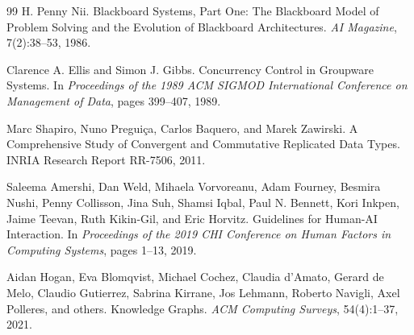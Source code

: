 \documentclass{article}
\begin{document}
\begin{thebibliography}{99}
H. Penny Nii.
\newblock Blackboard Systems, Part One: The Blackboard Model of Problem Solving and the Evolution of Blackboard Architectures.
\newblock \emph{AI Magazine}, 7(2):38--53, 1986.

Clarence A. Ellis and Simon J. Gibbs.
\newblock Concurrency Control in Groupware Systems.
\newblock In \emph{Proceedings of the 1989 ACM SIGMOD International Conference on Management of Data}, pages 399--407, 1989.

Marc Shapiro, Nuno Pregui\c{c}a, Carlos Baquero, and Marek Zawirski.
\newblock A Comprehensive Study of Convergent and Commutative Replicated Data Types.
\newblock INRIA Research Report RR-7506, 2011.

Saleema Amershi, Dan Weld, Mihaela Vorvoreanu, Adam Fourney, Besmira Nushi, Penny Collisson, Jina Suh, Shamsi Iqbal, Paul N. Bennett, Kori Inkpen, Jaime Teevan, Ruth Kikin-Gil, and Eric Horvitz.
\newblock Guidelines for Human-AI Interaction.
\newblock In \emph{Proceedings of the 2019 CHI Conference on Human Factors in Computing Systems}, pages 1--13, 2019.

Aidan Hogan, Eva Blomqvist, Michael Cochez, Claudia d'Amato, Gerard de Melo, Claudio Gutierrez, Sabrina Kirrane, Jos Lehmann, Roberto Navigli, Axel Polleres, and others.
\newblock Knowledge Graphs.
\newblock \emph{ACM Computing Surveys}, 54(4):1--37, 2021.

\end{thebibliography}
\end{document}

